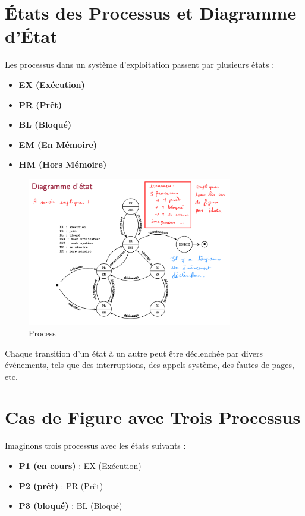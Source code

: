 
\section*{États des Processus et Diagramme d'État}

Les processus dans un système d'exploitation passent par plusieurs états :

\begin{itemize}
    \item \textbf{EX (Exécution)}
    \item \textbf{PR (Prêt)}
    \item \textbf{BL (Bloqué)}
    \item \textbf{EM (En Mémoire)}
    \item \textbf{HM (Hors Mémoire)}
\end{itemize}


\begin{figure}[h]
    \centering
    \includegraphics[width=0.8\textwidth]{Images/Diagrams/schema.png}
    \caption{Process}
\end{figure}

Chaque transition d'un état à un autre peut être déclenchée par divers événements, tels que des interruptions, des appels système, des fautes de pages, etc.

\section*{Cas de Figure avec Trois Processus}

Imaginons trois processus avec les états suivants :

\begin{itemize}
    \item \textbf{P1 (en cours)} : EX (Exécution)
    \item \textbf{P2 (prêt)} : PR (Prêt)
    \item \textbf{P3 (bloqué)} : BL (Bloqué)
\end{itemize}

